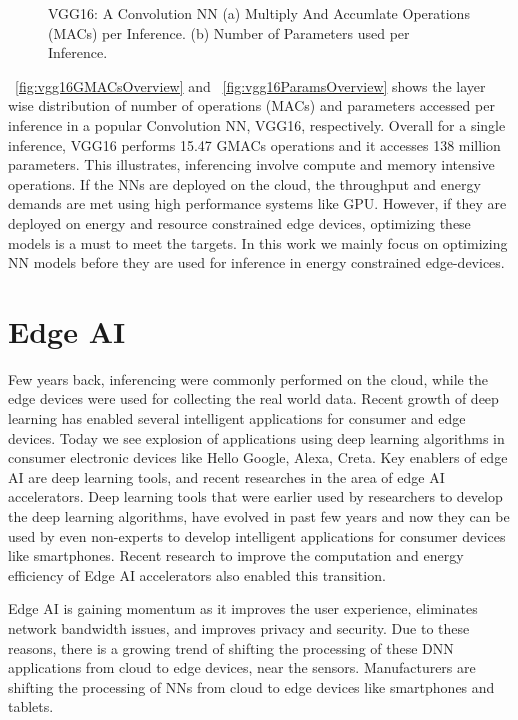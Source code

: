 \begin{figure}[!htb]
	\centering
	\captionsetup{font=sf}
	\hfil
	\caption{VGG16: A Convolution NN (a) Multiply And Accumlate Operations (MACs) per Inference. (b) Number of Parameters used per Inference.}
	\label{fig:MACAndParamsSize}
\end{figure}
\figurename{~\ref{fig:vgg16GMACsOverview}} and \figurename{~\ref{fig:vgg16ParamsOverview}} shows the layer wise distribution of number of operations (MACs) and parameters accessed per inference in a popular Convolution NN, VGG16, respectively. Overall for a single inference, VGG16 performs 15.47 GMACs operations and it accesses 138 million parameters. This illustrates, inferencing involve compute and memory intensive operations. If the NNs are deployed on the cloud, the throughput and energy demands are met using high performance systems like GPU. However, if they are deployed on energy and resource constrained edge devices, optimizing these models is a must to meet the targets. In this work we mainly focus on optimizing NN models before they are used for inference in energy constrained edge-devices.

\section{Edge AI}
Few years back, inferencing were commonly performed on the cloud, while the edge devices were used for collecting the real world data. Recent growth of deep learning has enabled several intelligent applications for consumer and edge devices. Today we see explosion of applications using deep learning algorithms in consumer electronic devices like Hello Google, Alexa, Creta. Key enablers of edge AI are deep learning tools, and recent researches in the area of edge AI accelerators. Deep learning tools that were earlier used by researchers to develop the deep learning algorithms, have evolved in past few years and now they can be used by even non-experts to develop intelligent applications for consumer devices like smartphones. Recent research to improve the computation and energy efficiency of Edge AI accelerators also enabled this transition. 

Edge AI is gaining momentum as it improves the user experience, eliminates network bandwidth issues, and improves privacy and security. Due to these reasons, there is a growing trend of shifting the processing of these DNN applications from cloud to edge devices, near the sensors. Manufacturers are shifting the processing of NNs from cloud to edge devices like smartphones and tablets. 

